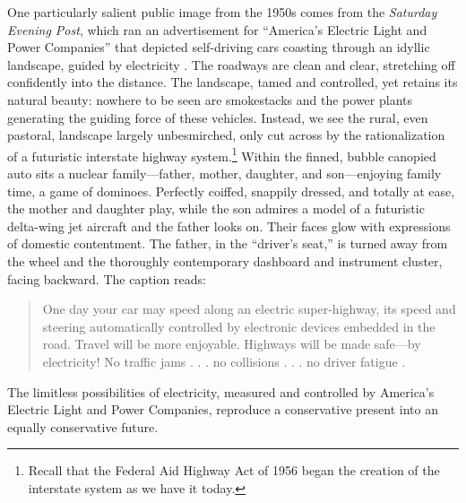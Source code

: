 One particularly salient public image from the 1950s comes from the
\emph{Saturday Evening Post}, which ran an advertisement for ``America's
Electric Light and Power Companies'' that depicted self-driving cars
coasting through an idyllic landscape, guided by electricity
\cite{weber}. The roadways 
are clean and clear, stretching off confidently into the distance. The
landscape, tamed and controlled, yet retains its natural beauty:
nowhere to be seen are smokestacks and the power plants generating the
guiding force of these vehicles. Instead, we see the rural, even
pastoral, landscape largely unbesmirched, only cut across by the
rationalization of a futuristic interstate highway system.\footnote{Recall that
the Federal Aid Highway Act of 1956 began the creation of the
interstate system as we have it today.} Within the finned, bubble
canopied auto sits a nuclear family---father,
mother, daughter, and son---enjoying family time, a game of dominoes.
Perfectly coiffed, snappily dressed, and totally at ease, the mother
and daughter play, while the son admires a model of a futuristic
delta-wing jet aircraft and the father looks on. Their faces glow with
expressions of domestic contentment. The father, in the ``driver's
seat,'' is turned away from the wheel and the thoroughly contemporary
dashboard and instrument cluster, facing backward. The caption reads: 
\begin{quote}
One day your car may speed along an electric super-highway, its speed
and steering automatically controlled by electronic devices embedded
in the road. Travel will be more enjoyable. Highways will be made
safe---by electricity! No traffic jams . . . no collisions . . . no
driver fatigue \cite{weber}.
\end{quote}
The limitless possibilities of electricity, measured and controlled by
America's Electric Light and Power Companies, reproduce a conservative
present into an equally conservative future. 

